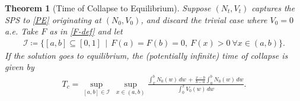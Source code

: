\documentclass[10pt,a4paper]{amsart}
\newtheorem{thm}{Theorem}[section]
\numberwithin{equation}{section}
\begin{document}
\begin{thm}[Time of Collapse to Equilibrium]
    Suppose $(N_t,V_t)$ captures the SPS to \eqref{PE} originating at $(N_0,V_0)$, and discard the trivial case where $V_0=0$ a.e. Take $F$ as in \eqref{F-def} and let 
    \begin{align*}
        \mathcal I\coloneq\{[a,b]\subseteq [0,1] \ \ | \ \ F(a)=F(b)=0, \ F(x)>0\ \forall x\in(a, b)\}.
    \end{align*}
    If the solution goes to equilibrium, the (potentially infinite) time of collapse is given by 
    \begin{align}\label{time-to-collapse}
        T_c=\sup_{[a,b]\in\mathcal I}~\sup_{x\in (a,b)}\frac{\displaystyle\int_x^b N_0(w) \, dw \, + \, \frac{x-b}{b-a}\int_a^b N_0(w) \, dw}{\displaystyle\int_0^x V_0(w) \, dw}. 
    \end{align}
\end{thm}
\end{document}
